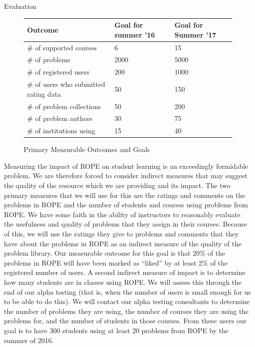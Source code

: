 \documentclass[11pt]{article}
\begin{document}
\begin{section}{Evaluation}
\begin{figure}
\begin{center}
\begin{tabular}{|l|l|l|}
  \hline
  \textbf{Outcome} & \textbf{Goal for summer '16} & \textbf{Goal for
  Summer '17} \\
  \hline
  \hline
  \# of supported courses & 6 & 15 \\
  \hline
  \# of problems & 2000 & 5000 \\
  \hline
  \# of registered users & 200 & 1000 \\
  \hline
  \# of users who submitted rating data & 50 & 150 \\
  \hline
  \# of problem collections & 50 & 200 \\
  \hline
  \# of problem authors & 30 & 75 \\
  \hline
  \# of institutions using & 15 & 40 \\
  \hline
\end{tabular}
\caption{Primary Measurable Outcomes and Goals}
\label{outcomes}
\end{center}
\end{figure}

Measuring the impact of ROPE on student learning is an exceedingly
formidable problem.  We are therefore forced to consider indirect measures
that may suggest the quality of the resource which we are providing and
its impact.  The two primary measures that we will use for this are the
ratings and comments on the problems in ROPE and the number of students
and courses using problems from ROPE.  We have some faith in the
ability of instructors to reasonably evaluate the usefulness and quality
of problems that they assign in their courses.  Because of this, we will
use the ratings they give to problems and comments that they have about
the problems in ROPE as an indirect measure of the quality of the
problem library.  Our measurable outcome for this goal is that 20\% of the
problems in ROPE will have been marked as ``liked'' by at least 2\% of
the registered number of users.  A second indirect measure of impact is to
determine how many students are in classes using ROPE.  We will assess
this through the end of our alpha testing (that is, when the number of
users is small enough for us to be able to do this).  We will contact our
alpha testing consultants to determine the number of problems they are
using, the number of courses they are using the problems for, and the
number of students in those courses.  From these users our goal is to have
300 students using at least 20 problems from ROPE by the summer of
2016. 

\end{section}
\end{document}

